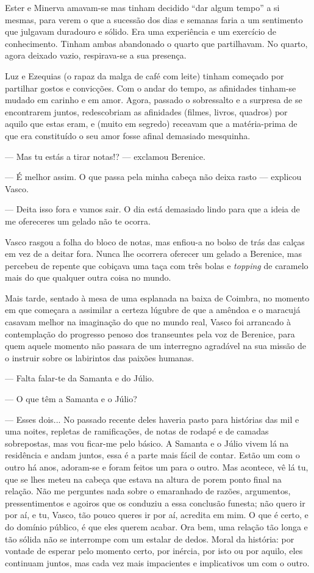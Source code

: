 Ester e Minerva amavam-se mas tinham decidido ``dar algum tempo'' a si
mesmas, para verem o que a sucessão dos dias e semanas faria a um
sentimento que julgavam duradouro e sólido. Era uma experiência e um
exercício de conhecimento. Tinham ambas abandonado o quarto que
partilhavam. No quarto, agora deixado vazio, respirava-se a sua
presença.

Luz e Ezequias (o rapaz da malga de café com leite) tinham começado
por partilhar gostos e convicções. Com o andar do tempo, as afinidades
tinham-se mudado em carinho e em amor. Agora, passado o sobressalto e a
surpresa de se encontrarem juntos, redescobriam as afinidades (filmes,
livros, quadros) por aquilo que estas eram, e (muito em segredo) receavam que a matéria-prima de que era constituído o seu amor fosse
afinal demasiado mesquinha.

--- Mas tu estás a tirar notas!? --- exclamou Berenice.

--- É melhor assim. O que passa pela minha cabeça não deixa rasto ---
  explicou Vasco.

--- Deita isso fora e vamos sair. O dia está demasiado lindo para que a
  ideia de me ofereceres um gelado não te ocorra.

  Vasco rasgou a folha
  do bloco de notas, mas enfiou-a no bolso de trás das calças em vez de
  a deitar fora. Nunca lhe ocorrera oferecer um gelado a Berenice, mas
  percebeu de repente que cobiçava uma taça com três bolas e
  \emph{topping }de caramelo mais do que qualquer outra coisa no mundo.

Mais tarde, sentado à mesa de uma esplanada na baixa de Coimbra, no
momento em que começara a assimilar a certeza lúgubre de que a amêndoa e
o maracujá casavam melhor na imaginação do que no mundo real, Vasco foi
arrancado à contemplação do progresso penoso dos transeuntes pela voz
de Berenice, para quem aquele momento não passara de um interregno
agradável na sua missão de o instruir sobre os labirintos das paixões
humanas.

--- Falta falar-te da Samanta e do Júlio.

--- O que têm a Samanta e o Júlio?

--- Esses dois... No passado recente deles haveria pasto para histórias
  das mil e uma noites, repletas de ramificações, de notas de rodapé e
  de camadas sobrepostas, mas vou ficar-me pelo básico. A Samanta e o Júlio vivem lá na residência e andam
juntos, essa é a parte mais fácil de contar. Estão um com o outro há
anos, adoram-se e foram feitos um para o outro. Mas acontece, vê lá tu,
que se lhes meteu na cabeça que estava na altura de porem ponto final na
relação. Não me perguntes nada sobre o emaranhado de razões, argumentos,
pressentimentos e agoiros que os conduziu a essa conclusão funesta; não
quero ir por aí, e tu, Vasco, tão pouco queres ir por aí, acredita em
mim. O que é certo, e do domínio público, é que eles querem acabar. Ora
bem, uma relação tão longa e tão sólida não se interrompe com um estalar
de dedos. Moral
da história: por vontade de esperar pelo momento certo, por inércia, por
isto ou por aquilo, eles continuam juntos, mas cada vez mais impacientes
e implicativos um com o outro.

